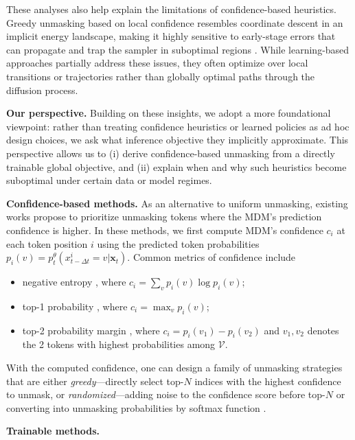These analyses also help explain the limitations of confidence-based heuristics. Greedy unmasking based on local confidence resembles coordinate descent in an implicit energy landscape, making it highly sensitive to early-stage errors that can propagate and trap the sampler in suboptimal regions \citep{kholkin2025sampling, chen2025beyond}. While learning-based approaches partially address these issues, they often optimize over local transitions or trajectories rather than globally optimal paths through the diffusion process.

\textbf{Our perspective.}
Building on these insights, we adopt a more foundational viewpoint: rather than treating confidence heuristics or learned policies as ad hoc design choices, we ask what inference objective they implicitly approximate. This perspective allows us to (i) derive confidence-based unmasking from a directly trainable global objective, and (ii) explain when and why such heuristics become suboptimal under certain data or model regimes.
\fi

\iffalse

\textbf{Confidence-based methods.} As an alternative to uniform unmasking, existing works propose to prioritize unmasking tokens where the MDM's prediction confidence is higher. In these methods, we first compute MDM's confidence $c_i$ at each token position $i$ using the predicted token probabilities $p_i(v)=p_t^\theta(x_{t-\Delta t}^{i}=v|\bm x_t)$. Common metrics of confidence include
\begin{itemize}[noitemsep, topsep=0pt]
    \item negative entropy \citep{ye2025dream7bdiffusionlarge}, where $c_i=\sum_v p_i(v)\log p_i(v)$;
    \item top-1 probability \citep{nie2025scalingmaskeddiffusionmodels}, where $c_i=\max_v p_i(v)$;
    \item top-2 probability margin \citep{kim2025train}, where $c_i=p_i(v_1)-p_i(v_2)$ and $v_1, v_2$ denotes the 2 tokens with highest probabilities among $\mathcal V$.
\end{itemize}
With the computed confidence, one can design a family of unmasking strategies that are either \textit{greedy}---directly select top-$N$ indices with the highest confidence to unmask, or \textit{randomized}---adding noise to the confidence score before top-$N$ \citep{kim2025train} or converting into unmasking probabilities by softmax function \citep{ye2025dream7bdiffusionlarge}.

\textbf{Trainable methods.} 

